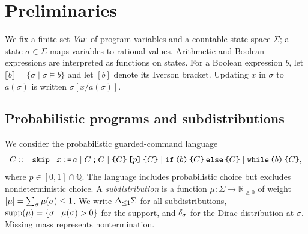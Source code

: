 \section{Preliminaries}
\label{sec:prelims}

We fix a finite set $\mathit{Var}$ of program variables and a countable state space $\Sigma$; a state $\sigma\in\Sigma$ maps variables to rational values. Arithmetic and Boolean expressions are interpreted as functions on states. For a Boolean expression $b$, let $\llbracket b\rrbracket=\{\sigma\mid \sigma\models b\}$ and let $[b]$ denote its Iverson bracket. Updating $x$ in $\sigma$ to $a(\sigma)$ is written $\sigma[x/a(\sigma)]$.

\subsection{Probabilistic programs and subdistributions}

We consider the probabilistic guarded-command language
\[
 C ::= \textnormal{\texttt{skip}} \mid x\,\textnormal{\texttt{:=}}\, a \mid C\,\textnormal{\texttt{;}}\, C \mid \textnormal{\texttt{\{}} C\textnormal{\texttt{\}}} \, \textnormal{\texttt{[}} p\textnormal{\texttt{]}} \, \textnormal{\texttt{\{}} C\textnormal{\texttt{\}}}
      \mid \textnormal{\texttt{if}}\,\textnormal{\texttt{(}} b\textnormal{\texttt{)}}\,\textnormal{\texttt{\{}} C\textnormal{\texttt{\}}}\,\textnormal{\texttt{else}}\,\textnormal{\texttt{\{}} C\textnormal{\texttt{\}}} \mid \textnormal{\texttt{while}}\,\textnormal{\texttt{(}} b\textnormal{\texttt{)}}\,\textnormal{\texttt{\{}} C\textnormal{\texttt{\}}},
\]
where $p\in[0,1]\cap\mathbb{Q}$. The language includes probabilistic choice but excludes nondeterministic choice. A \emph{subdistribution} is a function $\mu:\Sigma\to\mathbb{R}_{\geq0}$ of weight $|\mu|=\sum_{\sigma}\mu(\sigma)\leq1$. We write ${\Delta_{\leq 1} \Sigma}$ for all subdistributions, $\textnormal{supp}(\mu)=\{\sigma\mid\mu(\sigma)>0\}$ for the support, and $\delta_{\sigma}$ for the Dirac distribution at $\sigma$. Missing mass represents nontermination.

